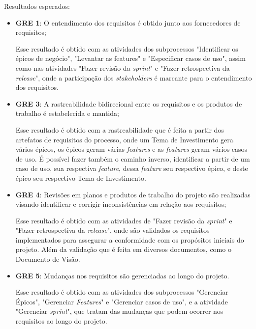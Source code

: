 	  \noindent
	  Resultados esperados:
	  
	  \begin{itemize}
	    
	    \item \textbf{GRE 1}: O entendimento dos requisitos é obtido junto aos fornecedores de requisitos;
	      
	      Esse resultado é obtido com as atividades dos subprocessos "Identificar os épicos de negócio", "Levantar as features" 
	      e "Especificar casos de uso", assim como nas atividades "Fazer revisão da \textit{sprint}" 
	      e "Fazer retrospectiva da \textit{release}", onde a participação dos \textit{stakeholders} é marcante para
	      o entendimento dos requisitos.
		  
	    \item \textbf{GRE 3}: A rastreabilidade bidirecional entre os requisitos e os produtos de trabalho é estabelecida e mantida;
	      
	      Esse resultado é obtido com a rastreabilidade que é feita a partir dos artefatos de requisitos do processo,
	      onde um Tema de Investimento gera vários épicos, os épicos geram várias \textit{features} e 
	      as \textit{features} geram vários casos de uso. É possível fazer também o caminho inverso,
	      identificar a partir de um caso de uso, sua respectiva \textit{feature}, dessa \textit{feature} seu respectivo épico, e 
	      deste épico seu respectivo Tema de Investimento.
	    
	    \item \textbf{GRE 4}: Revisões em planos e produtos de trabalho do projeto são realizadas visando identificar
	      e corrigir inconsistências em relação aos requisitos;
	    
	      Esse resultado é obtido com as atividades de "Fazer revisão da \textit{sprint}" 
	      e "Fazer retrospectiva da \textit{release}", onde são validados os requisitos implementados para assegurar
	      a conformidade com os propósitos iniciais do projeto. Além da validação que é feita em diversos documentos,
	      como o Documento de Visão.
	    
	    \item \textbf{GRE 5}: Mudanças nos requisitos são gerenciadas ao longo do projeto.
	    
	      Esse resultado é obtido com as atividades dos subprocessos "Gerenciar Épicos", "Gerenciar \textit{Features}"  e
	      "Gerenciar casos de uso", e a atividade "Gerenciar \textit{sprint}", que tratam das mudanças que podem ocorrer
	      nos requisitos ao longo do projeto.
	      
	  \end{itemize}

